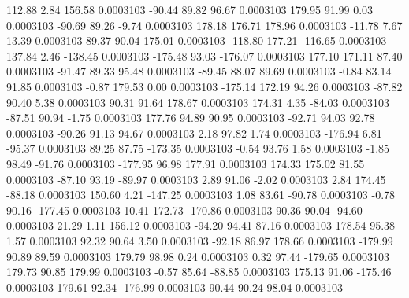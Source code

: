       112.88        2.84      156.58     0.0003103
      -90.44       89.82       96.67     0.0003103
      179.95       91.99        0.03     0.0003103
      -90.69       89.26       -9.74     0.0003103
      178.18      176.71      178.96     0.0003103
      -11.78        7.67       13.39     0.0003103
       89.37       90.04      175.01     0.0003103
     -118.80      177.21     -116.65     0.0003103
      137.84        2.46     -138.45     0.0003103
     -175.48       93.03     -176.07     0.0003103
      177.10      171.11       87.40     0.0003103
      -91.47       89.33       95.48     0.0003103
      -89.45       88.07       89.69     0.0003103
       -0.84       83.14       91.85     0.0003103
       -0.87      179.53        0.00     0.0003103
     -175.14      172.19       94.26     0.0003103
      -87.82       90.40        5.38     0.0003103
       90.31       91.64      178.67     0.0003103
      174.31        4.35      -84.03     0.0003103
      -87.51       90.94       -1.75     0.0003103
      177.76       94.89       90.95     0.0003103
      -92.71       94.03       92.78     0.0003103
      -90.26       91.13       94.67     0.0003103
        2.18       97.82        1.74     0.0003103
     -176.94        6.81      -95.37     0.0003103
       89.25       87.75     -173.35     0.0003103
       -0.54       93.76        1.58     0.0003103
       -1.85       98.49      -91.76     0.0003103
     -177.95       96.98      177.91     0.0003103
      174.33      175.02       81.55     0.0003103
      -87.10       93.19      -89.97     0.0003103
        2.89       91.06       -2.02     0.0003103
        2.84      174.45      -88.18     0.0003103
      150.60        4.21     -147.25     0.0003103
        1.08       83.61      -90.78     0.0003103
       -0.78       90.16     -177.45     0.0003103
       10.41      172.73     -170.86     0.0003103
       90.36       90.04      -94.60     0.0003103
       21.29        1.11      156.12     0.0003103
      -94.20       94.41       87.16     0.0003103
      178.54       95.38        1.57     0.0003103
       92.32       90.64        3.50     0.0003103
      -92.18       86.97      178.66     0.0003103
     -179.99       90.89       89.59     0.0003103
      179.79       98.98        0.24     0.0003103
        0.32       97.44     -179.65     0.0003103
      179.73       90.85      179.99     0.0003103
       -0.57       85.64      -88.85     0.0003103
      175.13       91.06     -175.46     0.0003103
      179.61       92.34     -176.99     0.0003103
       90.44       90.24       98.04     0.0003103
